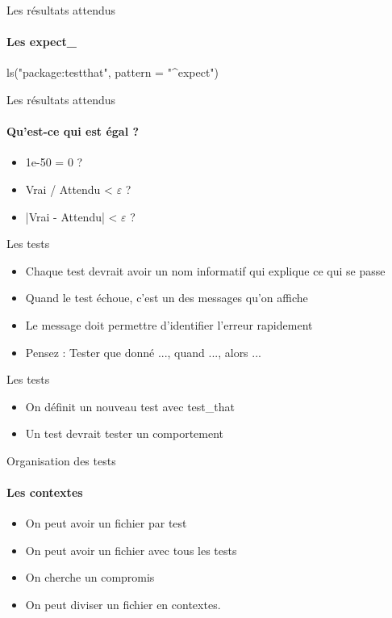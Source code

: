 \documentclass[11pt]{beamer}
\begin{document}
\begin{frame}{Les résultats attendus}
\framesubtitle{Les expect\_}
{\ttfamily ls("package:testthat", pattern = "\^{}expect")}
\end{frame}



\begin{frame}{Les résultats attendus}
\framesubtitle{Qu'est-ce qui est égal ?}
\begin{itemize}
\item 1e-50 = 0 ?
\item Vrai / Attendu < $\varepsilon$ ?
\item |Vrai - Attendu| < $\varepsilon$ ?
\end{itemize}
\end{frame}

\begin{frame}{Les tests}
\begin{itemize}
\item Chaque test devrait avoir un nom informatif qui explique ce qui se passe
\item Quand le test échoue, c'est un des messages qu'on affiche
\item Le message doit permettre d'identifier l'erreur rapidement
\item Pensez : Tester que donné ..., quand ..., alors ...
\end{itemize}
\end{frame}

\begin{frame}{Les tests}
\begin{itemize}
\item On définit un nouveau test avec test\_that
\item Un test devrait tester un comportement
\end{itemize}
\end{frame}

\begin{frame}{Organisation des tests}
\framesubtitle{Les contextes}
\begin{itemize}
\item On peut avoir un fichier par test
\item On peut avoir un fichier avec tous les tests
\item On cherche un compromis
\item On peut diviser un fichier en contextes. 
\end{itemize}
\end{frame}
\end{document}
